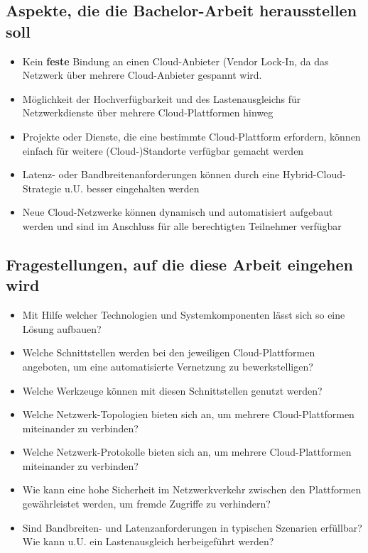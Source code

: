 \subsection{Aspekte, die die Bachelor-Arbeit herausstellen soll}
\begin{itemize}
    \item Kein \textbf{feste} Bindung an einen Cloud-Anbieter (\glqq Vendor Lock-In\grqq{}, da das Netzwerk über mehrere Cloud-Anbieter gespannt wird.
    \item Möglichkeit der Hochverfügbarkeit und des Lastenausgleichs für Netzwerkdienste über mehrere Cloud-Plattformen hinweg
    \item Projekte oder Dienste, die eine bestimmte Cloud-Plattform erfordern, können einfach für weitere (Cloud-)Standorte verfügbar gemacht werden
    \item Latenz- oder Bandbreitenanforderungen können durch eine Hybrid-Cloud-Strategie u.U. besser eingehalten werden
    \item Neue Cloud-Netzwerke können dynamisch und automatisiert aufgebaut werden und sind im Anschluss für alle berechtigten Teilnehmer verfügbar
\end{itemize}

\subsection{Fragestellungen, auf die diese Arbeit eingehen wird}
\begin{itemize}
    \item Mit Hilfe welcher Technologien und Systemkomponenten lässt sich so eine Lösung aufbauen?
    \item Welche Schnittstellen werden bei den jeweiligen Cloud-Plattformen angeboten, um eine automatisierte Vernetzung zu bewerkstelligen?
    \item Welche Werkzeuge können mit diesen Schnittstellen genutzt werden?
    \item Welche Netzwerk-Topologien bieten sich an, um mehrere Cloud-Plattformen miteinander zu verbinden?
    \item Welche Netzwerk-Protokolle bieten sich an, um mehrere Cloud-Plattformen miteinander zu verbinden?
    \item Wie kann eine hohe Sicherheit im Netzwerkverkehr zwischen den Plattformen gewährleistet werden, um fremde Zugriffe zu verhindern?
    \item Sind Bandbreiten- und Latenzanforderungen in typischen Szenarien erfüllbar? Wie kann u.U. ein Lastenausgleich herbeigeführt werden?
\end{itemize}


